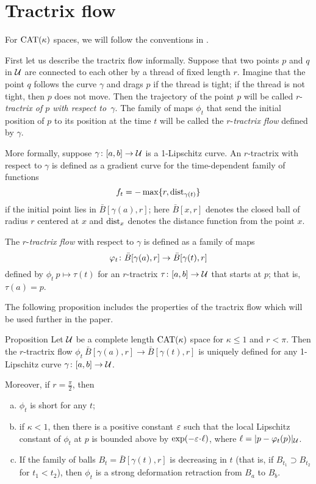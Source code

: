 \documentclass[oneside,a4paper, 12pt]{article}
\begin{document}
\section{Tractrix flow}\label{sec:Tractrix flow}

For $\mathrm{CAT}(\kappa)$ spaces, we will follow the conventions in \cite{akp}.

First let us describe the tractrix flow informally.
Suppose that two points $p$ and $q$ in ${\mathcal{U}}$ are connected to each other by a thread of fixed length $r$.
Imagine that the point $q$ follows the curve $\gamma$ and drags $p$ if the thread is tight; 
if the thread is not tight, then $p$ does not move.
Then the trajectory of the point $p$ will be called $r$-\emph{tractrix of $p$ with respect to~$\gamma$}.
The family of maps $\phi_t$ that send the initial position of $p$ to its position at the time $t$ will be called the $r$-\emph{tractrix flow} defined by $\gamma$.

More formally, suppose $\gamma\colon[a,b]\to \mathcal{U}$ is a 1-Lipschitz curve. 
An $r$-tractrix with respect to $\gamma$ is defined as a gradient curve for the time-dependent family of functions 
\[f_t=- \max\{r,\mathop{\rm dist}\nolimits_{\gamma(t)}\}\]
if the initial point lies in $\bar B[\gamma(a),r]$;
here $\bar B[x,r]$ denotes the closed ball of radius $r$ centered at $x$ and $\mathop{\rm dist}\nolimits_{x}$ denotes the distance function from the point $x$.

The $r$-\emph{tractrix flow} with respect to $\gamma$ is defined as a family of maps
\[\phi_t\:\bar B[\gamma(a),r]\z\to\bar B[\gamma(t),r]\]
defined by $\phi_t\:p\mapsto \tau(t)$
for an $r$-tractrix $\tau\colon[a,b]\to \mathcal{U}$ that starts at $p$; that is, $\tau(a)=p$.

The following proposition includes the properties of the tractrix flow which will be used further in the paper.

\begin{thm}{Proposition}\label{prop-def}
Let $\mathcal{U}$ be a complete length $\mathrm{CAT}(\kappa)$ space for $\kappa\le 1$ and $r<\pi$.
Then the $r$-tractrix flow $\phi_t\:\bar B[\gamma(a),r]\to\bar B[\gamma(t),r]$ is uniquely defined for any  1-Lipschitz curve $\gamma\colon[a,b]\to \mathcal{U}$.

Moreover, if $r=\tfrac\pi2$, then
\begin{enumerate}[(a)]
 \item\label{non-strict} $\phi_t$ is short for any $t$;
 \item\label{strict} if $\kappa<1$, then there is a positive constant $\varepsilon$ such that the local Lipschitz constant of $\phi_t$ at $p$ is bounded above by $\exp(-\eps\cdot\ell)$, where $\ell=|p-\varphi_t(p)|_{\mathcal{U}}$.
 \item\label{sharafutdinov} If the family of balls $B_t=\bar B[\gamma(t),r]$ is decreasing in $t$ (that is, if $B_{t_1}\supset B_{t_2}$ for $t_1<t_2$), then $\phi_t$ is a strong deformation retraction from $B_a$ to $B_b$.
\end{enumerate}
\end{thm}
\end{document}
